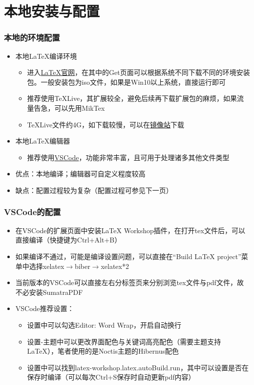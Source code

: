 \documentclass[xetex,mathserif,serif]{beamer}
\begin{document}
\section{本地安装与配置}
\begin{frame} 
    \frametitle{本地的环境配置} 
    \begin{itemize} 
        \item 本地\LaTeX{}编译环境
        \begin{itemize}
            \item 进入\href{https://www.latex-project.org/}{\LaTeX{}官网}，在其中的Get页面可以根据系统不同下载不同的环境安装包。一般安装包为iso文件，如果是Win10以上系统，直接运行即可
            \item 推荐使用TeXLive，其扩展较全，避免后续再下载扩展包的麻烦，如果流量告急，可以先用MikTex
            \item TeXLive文件约4G，如下载较慢，可以在\href{https://mirrors.tuna.tsinghua.edu.cn/CTAN/systems/texlive/Images/}{镜像站}下载
        \end{itemize}  
        \item 本地\LaTeX{}编辑器
        \begin{itemize}
            \item 推荐使用\href{https://code.visualstudio.com/}{VSCode}，功能非常丰富，且可用于处理诸多其他文件类型
        \end{itemize}
        \item 优点：本地编译；编辑器可自定义程度较高
        \item 缺点：配置过程较为复杂（配置过程可参见下一页）
    \end{itemize} 
\end{frame}

\begin{frame} 
    \frametitle{VSCode的配置} 
    \begin{itemize} 
        \item 在VSCode的扩展页面中安装LaTeX Workshop插件，在打开tex文件后，可以直接编译（快捷键为Ctrl+Alt+B）
        \item 如果编译不通过，可能是编译设置问题，可以直接在“Build LaTeX project”菜单中选择{xelatex$\rightarrow$biber$\rightarrow$xelatex*2}
        \item 当前版本的VSCode可以直接左右分标签页来分别浏览tex文件与pdf文件，故不必安装SumatraPDF
        \item VSCode推荐设置：
        \begin{itemize}
            \item 设置中可以勾选Editor: Word Wrap，开启自动换行
            \item 设置-主题中可以更改界面配色与关键词高亮配色（需要主题支持\LaTeX{}），笔者使用的是Noctis主题的Hibernus配色
            \item 设置中可以找到latex-workshop.latex.autoBuild.run，其中可以设置是否在保存时编译（可以每次Ctrl+S保存时自动更新pdf内容）
        \end{itemize}
    \end{itemize} 
\end{frame}
\end{document}
